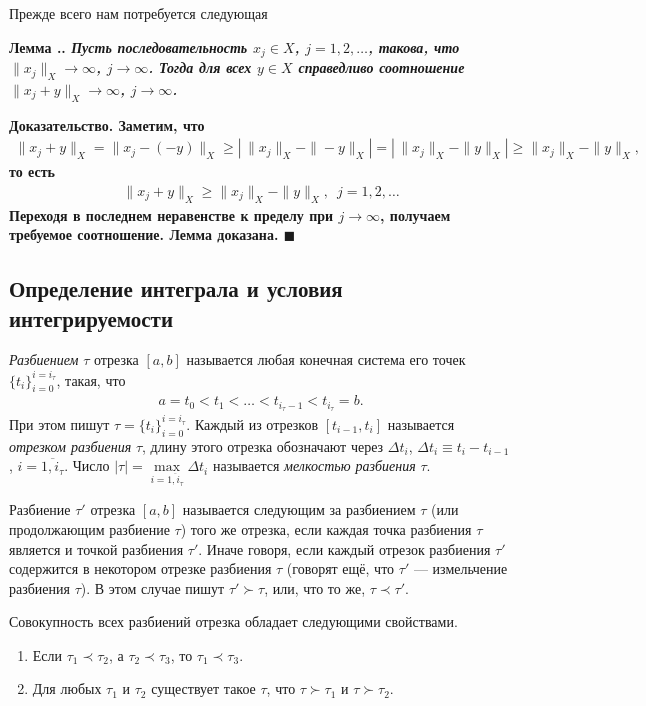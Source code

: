 \documentclass{report}
\renewcommand{\theenumi}{\arabic{enumi}}
\renewcommand{\labelenumi}{\theenumi)}
\newcounter{lem}[section]
\renewcommand{\thelem}{\thesection.\arabic{lem}}
\newenvironment{Lemma}{\par\refstepcounter{lem}\bf Лемма \thelem. \it}{\rm\par}
\newenvironment{Proof}{\par\noindent\bf Доказательство.\rm}{ $\blacksquare$\par}
\begin{document}
Прежде всего нам потребуется следующая

\begin{Lemma}\label{norm_x_j+y}
Пусть последовательность $x_j\in X$, $j=1,2,\dots$, такова, что $\|x_j\|_X\to\infty$, $j\to\infty$. Тогда для всех $y\in X$ справедливо соотношение $\|x_j+y\|_X\to\infty$, $j\to\infty$.
\end{Lemma}
\begin{Proof}
Заметим, что
\begin{gather*}
\|x_j+y\|_X=\|x_j-(-y)\|_X\geqslant|\,\|x_j\|_X-\|-y\|_X|=|\,\|x_j\|_X-\|y\|_X|\geqslant\|x_j\|_X-\|y\|_X,
\end{gather*}
то есть
\begin{gather*}
\|x_j+y\|_X\geqslant\|x_j\|_X-\|y\|_X,\,\,\,j=1,2,\dots
\end{gather*}
Переходя в последнем неравенстве к пределу при $j\to\infty$, получаем требуемое соотношение. Лемма доказана.
\end{Proof}

            \subsection{Определение интеграла и условия интегрируемости}
\textit{Разбиением} $\tau$ отрезка $[a,b]$ называется любая конечная система его точек $\{t_i\}^{i=i_\tau}_{i=0}$, такая, что
\begin{gather*}
a=t_0<t_1<\dots<t_{i_\tau-1}<t_{i_\tau}=b.
\end{gather*}
При этом пишут $\tau=\{t_i\}^{i=i_\tau}_{i=0}$. Каждый из отрезков $[t_{i-1},t_i]$ называется \textit{отрезком разбиения} $\tau$, длину этого отрезка обозначают через $\Delta t_i$,
$\Delta t_i\equiv t_i-t_{i-1}$, $i=\overline{1,i_\tau}$. Число $|\tau|=\max\limits_{i=\overline{1,i_\tau}}\Delta t_i$ называется \textit{мелкостью разбиения} $\tau$.

Разбиение $\tau'$ отрезка $[a,b]$ называется следующим за разбиением $\tau$ (или продолжающим разбиение $\tau$) того же отрезка, если каждая точка разбиения $\tau$ является и точкой
разбиения $\tau'$. Иначе говоря, если каждый отрезок разбиения $\tau'$ содержится в некотором отрезке разбиения $\tau$ (говорят ещё, что $\tau'$ --- измельчение разбиения $\tau$). В этом
случае пишут $\tau'\succ\tau$, или, что то же, $\tau\prec\tau'$.

Совокупность всех разбиений отрезка обладает следующими свойствами.
{\renewcommand{\labelenumi}{\theenumi$^\circ$}
\renewcommand{\theenumi}{\arabic{enumi}}
\begin{enumerate}
    \item Если $\tau_1\prec\tau_2$, а $\tau_2\prec\tau_3$, то $\tau_1\prec\tau_3$.
    \item Для любых $\tau_1$ и $\tau_2$ существует такое $\tau$, что $\tau\succ\tau_1$ и $\tau\succ\tau_2$.
\end{enumerate}}
\end{document}
